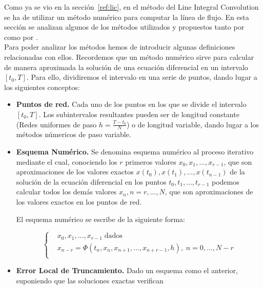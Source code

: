 Como ya se vio en la sección~\ref{ref:lic}, en el método del Line Integral
Convolution se ha de utilizar un método numérico para computar la línea de
flujo. En esta sección se analizan algunos de los métodos utilizados y
propuestos tanto por~\citet{osti_10185520} como por \citet{licthesis}.\\

Para poder analizar los métodos hemos de introducir algunas definiciones
relacionadas con ellos. Recordemos que un método numérico sirve para calcular de
manera aproximada la solución de una ecuación diferencial en un intervalo $[t_0,
T]$. Para ello, dividiremos el intervalo en una serie de puntos, dando lugar a
los siguientes conceptos:

\begin{itemize}

		\item \textbf{Puntos de red.} Cada uno de los puntos en los que se
				divide el intervalo $[t_0, T]$. Los subintervalos resultantes
				pueden ser de longitud constante (Redes uniformes de paso
				$h=\frac{T-t_0}{N}$) o de longitud variable, dando lugar a
				los métodos númericos de paso variable.

		\item \textbf{Esquema Numérico.} Se denomina esquema numérico al proceso
				iterativo mediante el cual, conociendo los $r$ primeros valores
				$x_0, x_1, \ldots, x_{r-1}$, que son aproximaciones de los
				valores exactos $x(t_0),x(t_1),\ldots,x(t_{n-1})$ de la solución
				de la ecuación diferencial en los puntos $t_0, t_1, \ldots,
				t_{r-1}$ podemos calcular todos los demás valores $x_n, n =
				r,\ldots,N$, que son aproximaciones de los valores exactos en
				los puntos de red.

				El esquema numérico se escribe de la siguiente forma:

				\begin{equation}
					\left\{ \begin{aligned}
							& x_0,x_1,\ldots,x_{r-1} \; \textrm{dados} \\
							& x_{n-r} = \Phi
							(t_n,x_n,x_{n+1},\ldots,x_{n+r-1},h), \; n =
							0,\ldots,N-r \\
					\end{aligned} \right.
				\end{equation}

		\item \textbf{Error Local de Truncamiento.} Dado un esquema como el
				anterior, suponiendo que las soluciones exactas verifican


\end{itemize}
